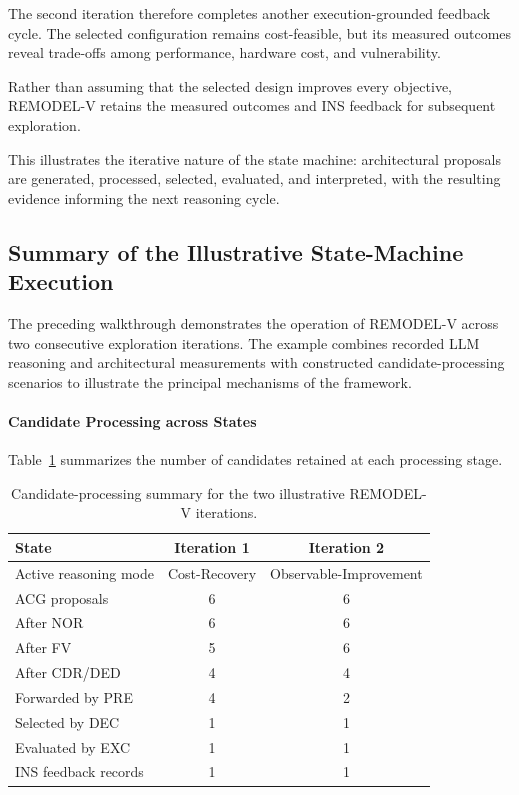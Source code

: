 The second iteration therefore completes
another execution-grounded feedback cycle.
The selected configuration remains
cost-feasible, but its measured outcomes
reveal trade-offs among performance,
hardware cost, and vulnerability.

Rather than assuming that the selected
design improves every objective, REMODEL-V
retains the measured outcomes and INS
feedback for subsequent exploration.

This illustrates the iterative nature
of the state machine: architectural
proposals are generated, processed,
selected, evaluated, and interpreted,
with the resulting evidence informing
the next reasoning cycle.


\subsection{Summary of the Illustrative State-Machine Execution}
\label{app:illustrative_summary}

The preceding walkthrough demonstrates the
operation of REMODEL-V across two consecutive
exploration iterations. The example combines
recorded LLM reasoning and architectural
measurements with constructed candidate-processing
scenarios to illustrate the principal
mechanisms of the framework.

\paragraph{Candidate Processing across States}

Table~\ref{tab:illustrative_state_summary}
summarizes the number of candidates retained
at each processing stage.

\begin{table}[htbp]
\centering
\caption{Candidate-processing summary for
the two illustrative REMODEL-V iterations.}
\label{tab:illustrative_state_summary}
\renewcommand{\arraystretch}{1.1}
\begin{tabular}{lcc}
\hline
\textbf{State} &
\textbf{Iteration 1} &
\textbf{Iteration 2} \\
\hline
Active reasoning mode & Cost-Recovery & Observable-Improvement \\
ACG proposals & 6 & 6 \\
After NOR & 6 & 6 \\
After FV & 5 & 6 \\
After CDR/DED & 4 & 4 \\
Forwarded by PRE & 4 & 2 \\
Selected by DEC & 1 & 1 \\
Evaluated by EXC & 1 & 1 \\
INS feedback records & 1 & 1 \\
\hline
\end{tabular}
\end{table}


